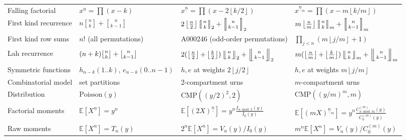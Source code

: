 \documentclass[a4paper]{amsart}
\numberwithin{equation}{section}
\newcommand{\Stirlingone}[0]{\genfrac[]{0pt}{}}
\newcommand{\Lah}[0]{\genfrac{\lfloor}{\rfloor}{0pt}{}}
\newcommand{\mStirlingone}[2]{\left[\mkern-3.8mu\middle|\genfrac{}{}{0pt}{}{#1}{#2}\middle|\mkern-3.8mu\right]}
\newcommand{\mLah}[2]{\left\lfloor\mkern-5.5mu\left\lfloor\genfrac{}{}{0pt}{}{#1}{#2}\right\rfloor\mkern-5.5mu\right\rfloor}
\newcommand{\uuline}[1]{\underline{\underline{#1}}}
\newcommand{\floor}[1]{\left\lfloor #1 \right\rfloor}
\begin{document}
\begin{landscape}
\begin{table}[h]
\begin{tabular}{|p{4.2cm}|p{5.2cm}|p{6.4cm}|p{6.6cm}|}
Falling factorial & $x^{\underline{n}} = \prod(x-k)$ & $x^{\uuline{n}} = \prod(x - 2\floor{k/2})$ & $x^{\uuline{n}_m} = \prod(x-m\floor{k/m})$ \\
First kind recurrence & $n\Stirlingone{n}{k}+\Stirlingone{n}{k-1}$ & $2\floor{\frac{n}{2}}\mStirlingone{n}{k}_2+\mStirlingone{n}{k-1}_2$ & $m\floor{\frac{n}{m}}\mStirlingone{n}{k}_m+\mStirlingone{n}{k-1}_m$ \\
First kind row sums & $n!$ (all permutations) & A000246 (odd-order permutations) & $\prod_{j<n}(m\floor{j/m}+1)$ \\
Lah recurrence & $(n+k)\Lah{n}{k}+\Lah{n}{k-1}$ & $2(\floor{\frac{n}{2}}{+}\floor{\frac{k}{2}})\mLah{n}{k}_2+\mLah{n}{k-1}_2$ & $m(\floor{\frac{n}{m}}{+}\floor{\frac{k}{m}})\mLah{n}{k}_m+\mLah{n}{k-1}_m$ \\
Symmetric functions & $h_{n-k}(1..k)$, $e_{n-k}(0..n{-}1)$ & $h,e$ at weights $2\floor{j/2}$ & $h,e$ at weights $m\floor{j/m}$ \\
Combinatorial model & set partitions & 2-compartment urns & $m$-compartment urns \\
Distribution & $\mathrm{Poisson}(y)$ & $\mathrm{CMP}((y/2)^2, 2)$ & $\mathrm{CMP}((y/m)^m, m)$ \\
Factorial moments & $\mathbb{E}[X^{\underline{n}}] = y^n$ & $\mathbb{E}[(2X)^{\uuline{n}}] = y^n \frac{I_{n \bmod 2}(y)}{I_0(y)}$ & $\mathbb{E}[(mX)^{\uuline{n}_m}] = y^n\frac{C^{(m)}_{n \bmod m}(y)}{C^{(m)}_0(y)}$ \\
Raw moments & $\mathbb{E}[X^n] = T_n(y)$ & $2^n\mathbb{E}[X^n] = V_n(y)/I_0(y)$ & $m^n\mathbb{E}[X^n] = V_n(y)/C^{(m)}_0(y)$ \\
\hline
\end{tabular}
\end{table}
\end{landscape}
\end{document}
